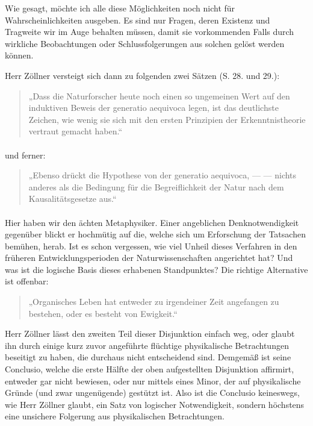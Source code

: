 \documentclass[a4paper, 11pt, oneside, german]{article}
\begin{document}
Wie gesagt, möchte ich alle diese Möglichkeiten noch nicht für Wahrscheinlichkeiten ausgeben. Es sind nur Fragen, deren Existenz und Tragweite wir im Auge behalten müssen, damit sie vorkommenden Falls durch wirkliche Beobachtungen oder Schlussfolgerungen aus solchen gelöst werden können.

Herr Zöllner versteigt sich dann zu folgenden zwei Sätzen (S. 28. und 29.): 
\begin{quotation}
„Dass die Naturforscher heute noch einen so ungemeinen Wert auf den induktiven Beweis der generatio aequivoca legen, ist das deutlichste Zeichen, wie wenig sie sich mit den ersten Prinzipien der Erkenntnistheorie vertraut gemacht haben.“
\end{quotation}
\paragraph{}
und ferner:
\begin{quotation}
„Ebenso drückt die Hypothese von der generatio aequivoca, --- --- nichts anderes als die Bedingung für die Begreiflichkeit der Natur nach dem Kausalitätsgesetze aus.“
\end{quotation}
\paragraph{}
Hier haben wir den ächten Metaphysiker. Einer angeblichen Denknotwendigkeit gegenüber blickt er hochmütig auf die, welche sich um Erforschung der Tatsachen bemühen, herab. Ist es schon vergessen, wie viel Unheil dieses Verfahren in den früheren Entwicklungsperioden der Naturwissenschaften angerichtet hat? Und was ist die logische Basis dieses erhabenen Standpunktes? Die richtige Alternative ist offenbar:
\begin{quotation}
„Organisches Leben hat entweder zu irgendeiner Zeit angefangen zu bestehen, oder es besteht von Ewigkeit.“
\end{quotation}
Herr Zöllner lässt den zweiten Teil dieser Disjunktion einfach weg, oder glaubt ihn durch einige kurz zuvor angeführte flüchtige physikalische Betrachtungen beseitigt zu haben, die durchaus nicht entscheidend sind. Demgemäß ist seine Conclusio, welche die erste Hälfte der oben aufgestellten Disjunktion affirmirt, entweder gar nicht bewiesen, oder nur mittels eines Minor, der auf physikalische Gründe (und zwar ungenügende) gestützt ist. Also ist die Conclusio keineswegs, wie Herr Zöllner glaubt, ein Satz von logischer Notwendigkeit, sondern höchstens eine unsichere Folgerung aus physikalischen Betrachtungen.
\end{document}
